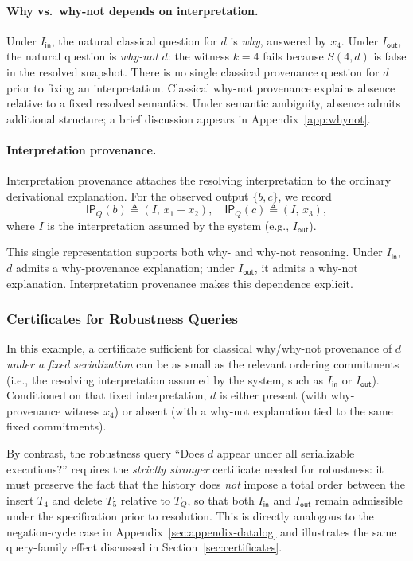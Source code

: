 \documentclass[acmsmall,nonacm]{acmart}
\theoremstyle{remark}
\numberwithin{definition}{section}
\numberwithin{theorem}{section}
\numberwithin{lemma}{section}
\numberwithin{corollary}{section}
\numberwithin{remark}{section}
\numberwithin{example}{section}
\numberwithin{observation}{section}
\numberwithin{assumption}{section}
\begin{document}
\paragraph{Why vs.\ why-not depends on interpretation.}
Under $I_{\mathsf{in}}$, the natural classical question for $d$ is \emph{why},
answered by $x_4$.
Under $I_{\mathsf{out}}$, the natural question is \emph{why-not} $d$: the witness
$k=4$ fails because $S(4,d)$ is false in the resolved snapshot.
There is no single classical provenance question for $d$ prior to fixing an
interpretation. Classical why-not provenance explains absence relative to a fixed resolved
semantics.
Under semantic ambiguity, absence admits additional structure; a brief discussion
appears in Appendix~\ref{app:whynot}.

\paragraph{Interpretation provenance.}
Interpretation provenance attaches the resolving interpretation to the ordinary
derivational explanation.
For the observed output $\{b,c\}$, we record
\[
  \mathsf{IP}_Q(b)\triangleq (I,\, x_1+x_2),\quad
  \mathsf{IP}_Q(c)\triangleq (I,\, x_3),
\]
where $I$ is the interpretation assumed by the system (e.g., $I_{\mathsf{out}}$).

This single representation supports both why- and why-not reasoning.
Under $I_{\mathsf{in}}$, $d$ admits a why-provenance explanation; under
$I_{\mathsf{out}}$, it admits a why-not explanation.
Interpretation provenance makes this dependence explicit.

\subsubsection{Certificates for Robustness Queries}

In this example, a certificate sufficient for classical why/why-not provenance of $d$ \emph{under a fixed serialization} can be as small as the relevant ordering commitments (i.e., the resolving interpretation assumed by the system, such as $I_{\mathsf{in}}$ or $I_{\mathsf{out}}$). Conditioned on that fixed interpretation, $d$ is either present (with why-provenance witness $x_4$) or absent (with a why-not explanation tied to the same fixed commitments).

By contrast, the robustness query “Does $d$ appear under all serializable executions?” requires the
\emph{strictly stronger} certificate needed for robustness: it must preserve the fact that the history does
\emph{not} impose a total order between the insert $T_4$ and delete $T_5$ relative to $T_Q$, so that both
$I_{\mathsf{in}}$ and $I_{\mathsf{out}}$ remain admissible under the specification prior to resolution. This
is directly analogous to the negation-cycle case in Appendix~\ref{sec:appendix-datalog} and illustrates the same
query-family effect discussed in Section~\ref{sec:certificates}.
\end{document}
